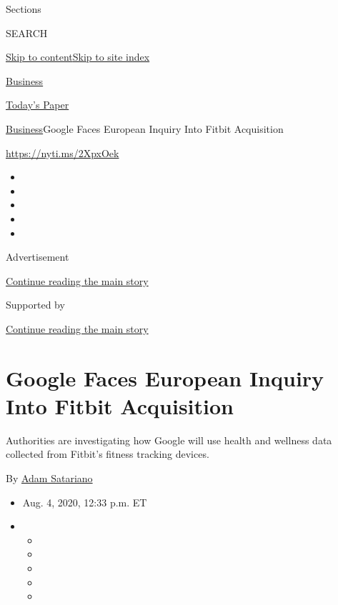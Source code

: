 Sections

SEARCH

\protect\hyperlink{site-content}{Skip to
content}\protect\hyperlink{site-index}{Skip to site index}

\href{https://www.nytimes3xbfgragh.onion/section/business}{Business}

\href{https://myaccount.nytimes3xbfgragh.onion/auth/login?response_type=cookie\&client_id=vi}{}

\href{https://www.nytimes3xbfgragh.onion/section/todayspaper}{Today's
Paper}

\href{/section/business}{Business}\textbar{}Google Faces European
Inquiry Into Fitbit Acquisition

\url{https://nyti.ms/2XpxOek}

\begin{itemize}
\item
\item
\item
\item
\item
\end{itemize}

Advertisement

\protect\hyperlink{after-top}{Continue reading the main story}

Supported by

\protect\hyperlink{after-sponsor}{Continue reading the main story}

\hypertarget{google-faces-european-inquiry-into-fitbit-acquisition}{%
\section{Google Faces European Inquiry Into Fitbit
Acquisition}\label{google-faces-european-inquiry-into-fitbit-acquisition}}

Authorities are investigating how Google will use health and wellness
data collected from Fitbit's fitness tracking devices.

By \href{https://www.nytimes3xbfgragh.onion/by/adam-satariano}{Adam
Satariano}

\begin{itemize}
\item
  Aug. 4, 2020, 12:33 p.m. ET
\item
  \begin{itemize}
  \item
  \item
  \item
  \item
  \item
  \end{itemize}
\end{itemize}


